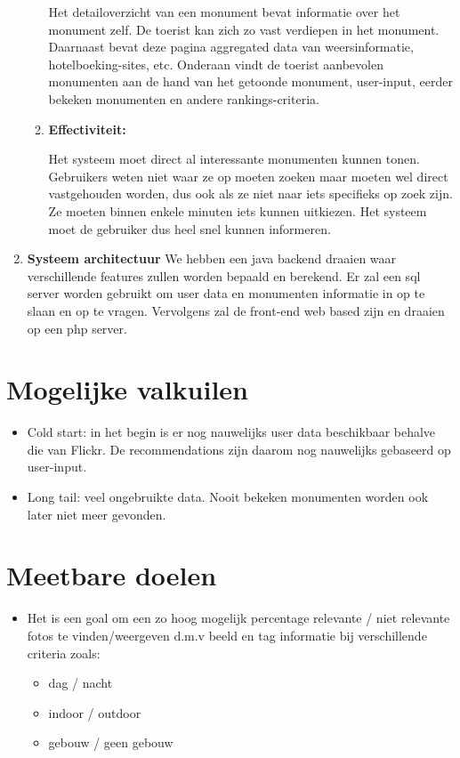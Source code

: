 \documentclass{article}
\begin{document}
\begin{enumerate}
\begin{enumerate}
		Het detailoverzicht van een monument bevat informatie over het monument zelf. De toerist kan zich zo vast verdiepen in het monument. Daarnaast bevat deze pagina aggregated data van weersinformatie, hotelboeking-sites, etc. Onderaan vindt de toerist aanbevolen monumenten aan de hand van het getoonde monument, user-input, eerder bekeken monumenten en andere rankings-criteria.
		
		\item{\textbf{Effectiviteit:}}
		
		Het systeem moet direct al interessante monumenten kunnen tonen. Gebruikers weten niet waar ze op moeten zoeken maar moeten wel direct vastgehouden worden, dus ook als ze niet naar iets specifieks op zoek zijn. Ze moeten binnen enkele minuten iets kunnen uitkiezen. Het systeem moet de gebruiker dus heel snel kunnen informeren.
	\end{enumerate}
	\item{\textbf{Systeem architectuur}} 
We hebben een java backend draaien waar verschillende features zullen worden bepaald en berekend. Er zal een sql server worden gebruikt om user data en monumenten informatie in op te slaan en op te vragen. Vervolgens zal de front-end web based zijn en draaien op een php server.
	
\end{enumerate}
\section{Mogelijke valkuilen}
\begin{itemize}
\item Cold start: in het begin is er nog nauwelijks user data beschikbaar behalve die van Flickr. De recommendations zijn daarom nog nauwelijks gebaseerd op user-input.
\item Long tail: veel ongebruikte data. Nooit bekeken monumenten worden ook later niet meer gevonden.
\end{itemize}
\section{Meetbare doelen}
\begin{itemize}
\item Het is een goal om een zo hoog mogelijk percentage relevante / niet relevante fotos te vinden/weergeven d.m.v beeld en tag informatie bij verschillende criteria zoals:
\begin{itemize}
\item dag / nacht
\item indoor / outdoor
\item gebouw / geen gebouw
\end{itemize}

\end{itemize}
\end{document}
